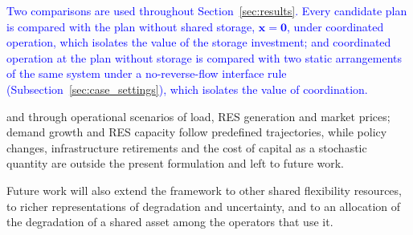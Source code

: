 %
\textcolor{blue}{
    Two comparisons are used throughout Section~\ref{sec:results}. Every candidate plan is compared with the plan without shared storage, $\boldsymbol{x} = \boldsymbol{0}$, under coordinated operation, which isolates the value of the storage investment; and coordinated operation at the plan without storage is compared with two static arrangements of the same system under a no-reverse-flow interface rule (Subsection~\ref{sec:case_settings}), which isolates the value of coordination.
}

    and through operational scenarios of load, RES generation and market prices; demand growth and RES capacity follow predefined trajectories, while policy changes, infrastructure retirements and the cost of capital as a stochastic quantity are outside the present formulation and left to future work.

    Future work will also extend the framework to other shared flexibility resources, to richer representations of degradation and uncertainty, and to an allocation of the degradation of a shared asset among the operators that use it.
